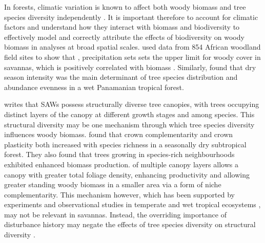 \documentclass[11pt,a4paper]{article}
\newcommand{\textapprox}{\raisebox{0.5ex}{\texttildelow}}  %
\begin{document}



In forests, climatic variation is known to affect both woody biomass \citep{Michaletz2014, Michaletz2018} and tree species diversity independently \citep{Spasojevic2014}. It is important therefore to account for climatic factors and understand how they interact with biomass and biodiversity to effectively model and correctly attribute the effects of biodiversity on woody biomass in analyses at broad spatial scales. \citet{Sankaran2005} used data from 854 African woodland field sites to show that \rnew{below a threshold of \textapprox{}650 mm MAP}, precipitation sets sets the upper limit for woody cover in savannas, which is positively correlated with biomass \citep{Chisholm2013, Prado-Junior2016}. Similarly, \citet{Condit2013} found that dry season intensity was the main determinant of tree species distribution and abundance evenness in a wet Panamanian tropical forest.

\citet{Solbrig1996} writes that SAWs possess structurally diverse tree canopies, with trees occupying distinct layers of the canopy at different growth stages and among species. This structural diversity may be one mechanism through which tree species diversity influences woody biomass. \citet{Kunz2019} found that crown complementarity and crown plasticity both increased with species richness in a seasonally dry subtropical forest. They also found that trees growing in species-rich neighbourhoods exhibited enhanced biomass production.  of multiple canopy layers allows a  canopy with  greater total foliage density, enhancing productivity and allowing greater standing woody biomass in a smaller area via a form of niche complementarity. This mechanism however, which has been supported by experiments and observational studies in temperate and wet tropical ecosystems \citep{Hardiman2011, Stark2012}, may not be relevant in savannas. Instead, the overriding importance of disturbance history may negate the effects of tree species diversity on structural diversity \citep{Grime2012}.
\end{document}
